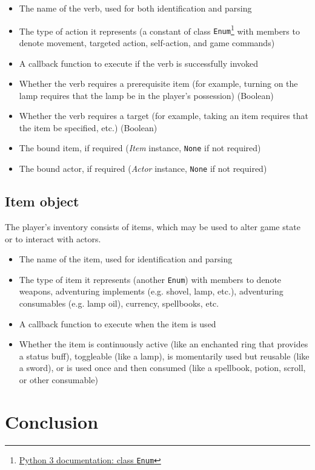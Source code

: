 \documentclass[11pt,letterpaper]{article}
\begin{document}
\begin{itemize}
    \item The name of the verb, used for both identification and parsing
    \item The type of action it represents (a constant of class {\tt Enum}\footnote{\href{https://docs.python.org/3/library/enum.html}{Python 3 documentation: class {\tt Enum}}} with members to denote movement, targeted action, self-action, and game commands)
    \item A callback function to execute if the verb is successfully invoked
    \item Whether the verb requires a prerequisite item (for example, turning on the lamp requires that the lamp be in the player's possession) (Boolean)
    \item Whether the verb requires a target (for example, taking an item requires that the item be specified, etc.) (Boolean)
    \item The bound item, if required ({\it Item} instance, {\tt None} if not required)
    \item The bound actor, if required ({\it Actor} instance, {\tt None} if not required)
\end{itemize}

\subsection{Item object}

The player's inventory consists of items, which may be used to alter game state or to interact with actors.

\begin{itemize}
    \item The name of the item, used for identification and parsing
    \item The type of item it represents (another {\tt Enum}) with members to denote weapons, adventuring implements (e.g. shovel, lamp, etc.), adventuring consumables (e.g. lamp oil), currency, spellbooks, etc.
    \item A callback function to execute when the item is used
    \item Whether the item is continuously active (like an enchanted ring that provides a status buff), toggleable (like a lamp), is momentarily used but reusable (like a sword), or is used once and then consumed (like a spellbook, potion, scroll, or other consumable)
\end{itemize}

\section{Conclusion}
\end{document}

